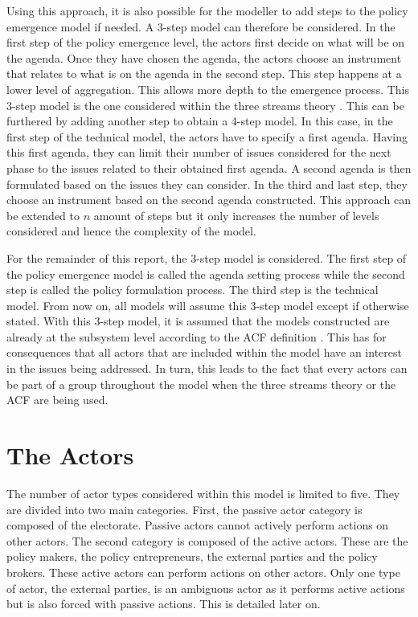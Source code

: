  
Using this approach, it is also possible for the modeller to add steps to the policy emergence model if needed. A 3-step model can therefore be considered. In the first step of the policy emergence level, the actors first decide on what will be on the agenda. Once they have chosen the agenda, the actors choose an instrument that relates to what is on the agenda in the second step. This step happens at a lower level of aggregation. This allows more depth to the emergence process. This 3-step model is the one considered within the three streams theory \citep{zahariadis2014ambiguity}. This can be furthered by adding another step to obtain a 4-step model. In this case, in the first step of the technical model, the actors have to specify a first agenda. Having this first agenda, they can limit their number of issues considered for the next phase to the issues related to their obtained first agenda. A second agenda is then formulated based on the issues they can consider. In the third and last step, they choose an instrument based on the second agenda constructed. This approach can be extended to $n$ amount of steps but it only increases the number of levels considered and hence the complexity of the model.
 
For the remainder of this report, the 3-step model is considered. The first step of the policy emergence model is called the agenda setting process while the second step is called the policy formulation process. The third step is the technical model. From now on, all models will assume this 3-step model except if otherwise stated. With this 3-step model, it is assumed that the models constructed are already at the subsystem level according to the ACF definition \citep{jenkins2014advocacy, mccool1998subsystem}. This has for consequences that all actors that are included within the model have an interest in the issues being addressed. In turn, this leads to the fact that every actors can be part of a group throughout the model when the three streams theory or the ACF are being used.

%
\section{The Actors}
\label{sec:actors}

The number of actor types considered within this model is limited to five. They are divided into two main categories. First, the passive actor category is composed of the electorate. Passive actors cannot actively perform actions on other actors. The second category is composed of the active actors. These are the policy makers, the policy entrepreneurs, the external parties and the policy brokers. These active actors can perform actions on other actors. Only one type of actor, the external parties, is an ambiguous actor as it performs active actions but is also forced with passive actions. This is detailed later on.

